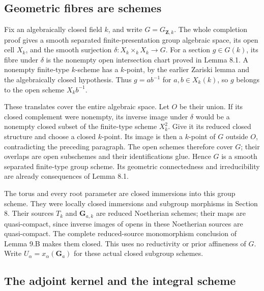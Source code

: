 \documentclass[11pt,a4paper,openany]{report}
\newcounter{none}
\begin{document}
\subsection{Geometric fibres are schemes}\label{AG-RG-05-geometric-fibres-are-schemes}

Fix an algebraically closed field \(k\), and write \(G=G_{\mathbf Z,k}\). The whole completion proof gives a smooth separated finite-presentation group algebraic space, its open cell \(X_k\), and the smooth surjection \(\delta:X_k\times_kX_k\to G\). For a section \(g\in G(k)\), its fibre under \(\delta\) is the nonempty open intersection chart proved in Lemma 8.1. A nonempty finite-type \(k\)-scheme has a \(k\)-point, by the earlier Zariski lemma and the algebraically closed hypothesis. Thus \(g=ab^{-1}\) for \(a,b\in X_k(k)\), so \(g\) belongs to the open scheme \(X_kb^{-1}\).

These translates cover the entire algebraic space. Let \(O\) be their union. If its closed complement were nonempty, its inverse image under \(\delta\) would be a nonempty closed subset of the finite-type scheme \(X_k^2\). Give it its reduced closed structure and choose a closed \(k\)-point. Its image is then a \(k\)-point of \(G\) outside \(O\), contradicting the preceding paragraph. The open schemes therefore cover \(G\); their overlaps are open subschemes and their identifications glue. Hence \(G\) is a smooth separated finite-type group scheme. Its geometric connectedness and irreducibility are already consequences of Lemma 8.1.

The torus and every root parameter are closed immersions into this group scheme. They were locally closed immersions and subgroup morphisms in Section 8. Their sources \(T_k\) and \(\mathbf G_{a,k}\) are reduced Noetherian schemes; their maps are quasi-compact, since inverse images of opens in these Noetherian sources are quasi-compact. The complete reduced-source monomorphism conclusion of Lemma 9.B makes them closed. This uses no reductivity or prior affineness of \(G\). Write \(U_\alpha=x_\alpha(\mathbf G_a)\) for these actual closed subgroup schemes.

\subsection{The adjoint kernel and the integral scheme}\label{AG-RG-05-the-adjoint-kernel-and-the-integral-scheme}
\end{document}
